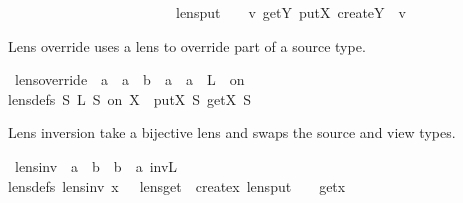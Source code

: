 \begin{isabellebody}
\ \ \ \ \ \ \ \ \ \ \ \ \ \ \ \ \ \ \ \ \ \ \ {\isacharcomma}\ lens{\isacharunderscore}put\ {\isacharequal}\ {\isasymlambda}\ {\isasymsigma}\ v{\isachardot}\ get\isactrlbsub Y\isactrlesub \ {\isacharparenleft}put\isactrlbsub X\isactrlesub \ {\isacharparenleft}create\isactrlbsub Y\isactrlesub \ {\isasymsigma}{\isacharparenright}\ v{\isacharparenright}\ {\isasymrparr}{\isachardoublequoteclose}%
\begin{isamarkuptext}%
Lens override uses a lens to override part of a source type.%
\end{isamarkuptext}\isamarkuptrue%
\isamarkupfalse%
\ lens{\isacharunderscore}override\ {\isacharcolon}{\isacharcolon}\ {\isachardoublequoteopen}{\isacharprime}a\ {\isasymRightarrow}\ {\isacharprime}a\ {\isasymRightarrow}\ {\isacharparenleft}{\isacharprime}b\ {\isasymLongrightarrow}\ {\isacharprime}a{\isacharparenright}\ {\isasymRightarrow}\ {\isacharprime}a{\isachardoublequoteclose}\ {\isacharparenleft}{\isachardoublequoteopen}{\isacharunderscore}\ {\isasymoplus}\isactrlsub L\ {\isacharunderscore}\ on\ {\isacharunderscore}{\isachardoublequoteclose}\ {\isacharbrackleft}{}{}{\isacharcomma}{}{\isacharcomma}{}{}{\isacharbrackright}\ {}{}{\isacharparenright}\ \isanewline
{\isacharbrackleft}lens{\isacharunderscore}defs{\isacharbrackright}{\isacharcolon}\ {\isachardoublequoteopen}S\ {\isasymoplus}\isactrlsub L\ S\ on\ X\ {\isacharequal}\ put\isactrlbsub X\isactrlesub \ S\ {\isacharparenleft}get\isactrlbsub X\isactrlesub \ S%
\begin{isamarkuptext}%
Lens inversion take a bijective lens and swaps the source and view types.%
\end{isamarkuptext}\isamarkuptrue%
\isamarkupfalse%
\ lens{\isacharunderscore}inv\ {\isacharcolon}{\isacharcolon}\ {\isachardoublequoteopen}{\isacharparenleft}{\isacharprime}a\ {\isasymLongrightarrow}\ {\isacharprime}b{\isacharparenright}\ {\isasymRightarrow}\ {\isacharparenleft}{\isacharprime}b\ {\isasymLongrightarrow}\ {\isacharprime}a{\isacharparenright}{\isachardoublequoteclose}\ {\isacharparenleft}{\isachardoublequoteopen}inv\isactrlsub L{\isachardoublequoteclose}{\isacharparenright}\ \isanewline
{\isacharbrackleft}lens{\isacharunderscore}defs{\isacharbrackright}{\isacharcolon}\ {\isachardoublequoteopen}lens{\isacharunderscore}inv\ x\ {\isacharequal}\ {\isasymlparr}\ lens{\isacharunderscore}get\ {\isacharequal}\ create\isactrlbsub x\isactrlesub {\isacharcomma}\ lens{\isacharunderscore}put\ {\isacharequal}\ {\isasymlambda}\ {\isasymsigma}{\isachardot}\ get\isactrlbsub x\isactrlesub \ {\isasymrparr}{\isachardoublequoteclose}%

\end{isabellebody}
